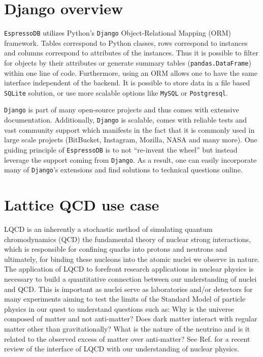 \hypertarget{django-overview}{%
\section{Django overview}\label{django-overview}}

\texttt{EspressoDB} utilizes Python's \texttt{Django} Object-Relational
Mapping (ORM) framework. Tables correspond to Python classes, rows
correspond to instances and columns correspond to attributes of the
instances. Thus it is possible to filter for objects by their attributes
or generate summary tables (\texttt{pandas.DataFrame}) within one line
of code. Furthermore, using an ORM allows one to have the same interface
independent of the backend. It is possible to store data in a file based
\texttt{SQLite} solution, or use more scalable options like
\texttt{MySQL} or \texttt{Postgresql}.

\texttt{Django} is part of many open-source projects and thus comes with
extensive documentation. Additionally, \texttt{Django} is scalable,
comes with reliable tests and vast community support which manifests in
the fact that it is commonly used in large scale projects (BitBucket,
Instagram, Mozilla, NASA and many more). One guiding principle of
\texttt{EspressoDB} is to not ``re-invent the wheel'' but instead
leverage the support coming from \texttt{Django}. As a result, one can
easily incorporate many of \texttt{Django}'s extensions and find
solutions to technical questions online.

\hypertarget{lattice-qcd-use-case}{%
\section{Lattice QCD use case}\label{lattice-qcd-use-case}}

LQCD is an inherently a stochastic method of simulating quantum
chromodynamics (QCD) the fundamental theory of nuclear strong
interactions, which is responsible for confining quarks into protons and
neutrons and ultimately, for binding these nucleons into the atomic
nuclei we observe in nature. The application of LQCD to forefront
research applications in nuclear physics is necessary to build a
quantitative connection between our understanding of nuclei and QCD.
This is important as nuclei serve as laboratories and/or detectors for
many experiments aiming to test the limits of the Standard Model of
particle physics in our quest to understand questions such as: Why is
the universe composed of matter and not anti-matter? Does dark matter
interact with regular matter other than gravitationally? What is the
nature of the neutrino and is it related to the observed excess of
matter over anti-matter? See Ref. \cite{Drischler:2019xuo} for a recent
review of the interface of LQCD with our understanding of nuclear
physics.

